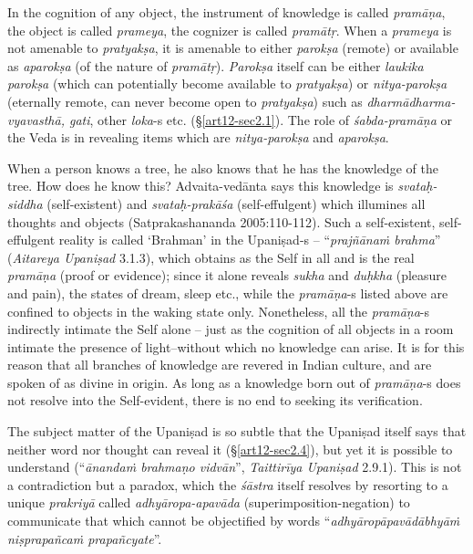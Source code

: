 In the cognition of any object, the instrument of knowledge is called {\sl pramāṇa}, the object is called {\sl prameya}, the cognizer is called {\sl pramātṛ}. When a {\sl prameya} is not amenable to {\sl pratyakṣa}, it is amenable to either {\sl parokṣa} (remote) or available as {\sl aparokṣa} (of the nature of {\sl pramātṛ}). {\sl Parokṣa} itself can be either {\sl laukika parokṣa} (which can potentially become available to {\sl pratyakṣa}) or {\sl nitya-parokṣa} (eternally remote, can never become open to {\sl pratyakṣa}) such as {\sl dharmādharma-vyavasthā, gati}, other {\sl loka}-s etc. (\S\ref{art12-sec2.1}). The role of {\sl śabda-pramāṇa} or the Veda is in revealing items which are {\sl nitya-parokṣa} and {\sl aparokṣa}.

When a person knows a tree, he also knows that he has the knowledge of the tree. How does he know this? Advaita-vedānta says this knowledge is {\sl svataḥ-siddha} (self-existent) and {\sl svataḥ-prakāśa} (self-effulgent) which illumines all thoughts and objects (Satprakashananda 2005:110-112). Such a self-existent, self-effulgent reality is called `Brahman' in the Upaniṣad-s -- ``{\sl prajñānaṁ brahma}'' ({\sl Aitareya Upaniṣad} 3.1.3), which obtains as the Self in all and is the real {\sl pramāṇa} (proof or evidence); since it alone reveals {\sl sukha} and {\sl duḥkha} (pleasure and pain), the states of dream, sleep etc., while the {\sl pramāṇa}-s listed above are conﬁned to objects in the waking state only. Nonetheless, all the {\sl pramāṇa}-s indirectly intimate the Self alone -- just as the cognition of all objects in a room intimate the presence of light--without which no knowledge can arise. It is for this reason that all branches of knowledge are revered in Indian culture, and are spoken of as divine in origin. As long as a knowledge born out of {\sl pra\-mā\-ṇa}-s does not resolve into the Self-evident, there is no end to seeking its veriﬁcation.

The subject matter of the Upaniṣad is so subtle that the Upaniṣad itself says that neither word nor thought can reveal it (\S\ref{art12-sec2.4}), but yet it is possible to understand (``{\sl ānandaṁ brahmaṇo vidvān}'', {\sl Taittirīya Upaniṣad} 2.9.1). This is not a contradiction but a paradox, which the {\sl śāstra} itself resolves by resorting to a unique {\sl prakriyā} called {\sl adhyāropa-apavāda} (superimposition-negation) to communicate that which cannot be objectiﬁed by words ``{\sl adhyāropāpavādābhyāṁ niṣprapañcaṁ prapañcyate}''. 

